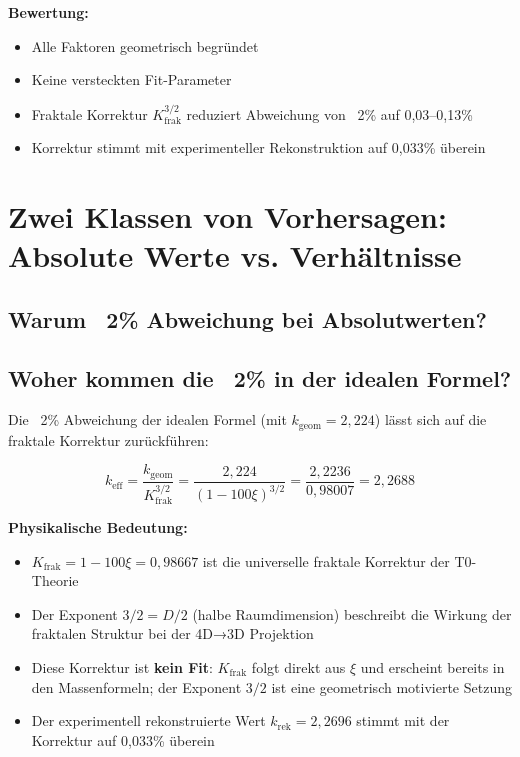 	\textbf{Bewertung:}
	\begin{itemize}
		\item Alle Faktoren geometrisch begründet
		\item Keine versteckten Fit-Parameter
		\item Fraktale Korrektur $K_\text{frak}^{3/2}$ reduziert Abweichung von ~2\% auf 0{,}03--0{,}13\%
		\item Korrektur stimmt mit experimenteller Rekonstruktion auf 0{,}033\% überein
	\end{itemize}
	\section{Zwei Klassen von Vorhersagen: Absolute Werte vs. Verhältnisse}
	
	\subsection{Warum ~2\% Abweichung bei Absolutwerten?}
	
	\subsection{Woher kommen die ~2\% in der idealen Formel?}
	
	Die ~2\% Abweichung der idealen Formel (mit $k_\text{geom} = 2{,}224$) lässt sich auf die fraktale Korrektur zurückführen:
	
	\begin{equation}
		k_\text{eff} = \frac{k_\text{geom}}{K_\text{frak}^{3/2}} = \frac{2{,}224}{(1-100\xi)^{3/2}} = \frac{2{,}2236}{0{,}98007} = 2{,}2688
	\end{equation}
	
	\textbf{Physikalische Bedeutung:}
	\begin{itemize}
		\item $K_\text{frak} = 1 - 100\xi = 0{,}98667$ ist die universelle fraktale Korrektur der T0-Theorie
		\item Der Exponent $3/2 = D/2$ (halbe Raumdimension) beschreibt die Wirkung der fraktalen Struktur bei der 4D→3D Projektion
		\item Diese Korrektur ist \textbf{kein Fit}: $K_\text{frak}$ folgt direkt aus $\xi$ und erscheint bereits in den Massenformeln; der Exponent $3/2$ ist eine geometrisch motivierte Setzung
		\item Der experimentell rekonstruierte Wert $k_\text{rek} = 2{,}2696$ stimmt mit der Korrektur auf 0{,}033\% überein
	\end{itemize}
	
